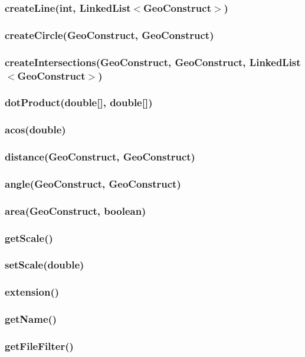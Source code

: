 \documentclass[a4paper,10pt]{report}
\begin{document}
\subsubsection{createLine(int, LinkedList$<$GeoConstruct$>$)}
\subsubsection{createCircle(GeoConstruct, GeoConstruct)}
\subsubsection{createIntersections(GeoConstruct, GeoConstruct, LinkedList$<$GeoConstruct$>$)}
\subsubsection{dotProduct(double[], double[])}
\subsubsection{acos(double)}
\subsubsection{distance(GeoConstruct, GeoConstruct)}
\subsubsection{angle(GeoConstruct, GeoConstruct)}
\subsubsection{area(GeoConstruct, boolean)}
\subsubsection{getScale()}
\subsubsection{setScale(double)}
\subsubsection{extension()}
\subsubsection{getName()}
\subsubsection{getFileFilter()}
\end{document}
